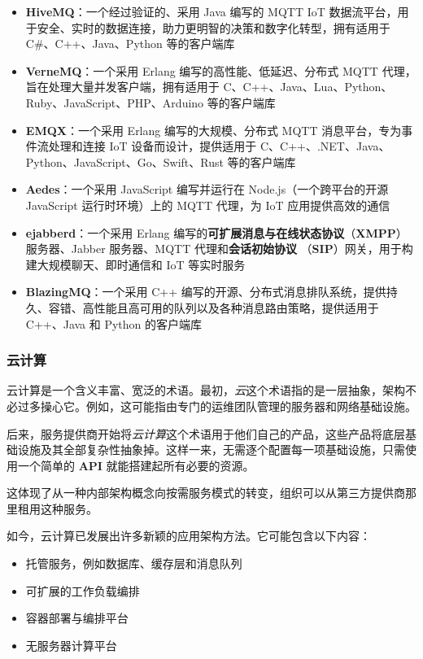 \begin{itemize}
\label{idx:1365}
\item \textbf{HiveMQ}：一个经过验证的、采用 Java 编写的 MQTT IoT 数据流平台，用于安全、实时的数据连接，助力更明智的决策和数字化转型，拥有适用于 C\#、C++、Java、Python 等的客户端库
\label{idx:1366}
\item \textbf{VerneMQ}：一个采用 Erlang 编写的高性能、低延迟、分布式 MQTT 代理，旨在处理大量并发客户端，拥有适用于 C、C++、Java、Lua、Python、Ruby、JavaScript、PHP、Arduino 等的客户端库
\label{idx:1367}
\item \textbf{EMQX}：一个采用 Erlang 编写的大规模、分布式 MQTT 消息平台，专为事件流处理和连接 IoT 设备而设计，提供适用于 C、C++、.NET、Java、Python、JavaScript、Go、Swift、Rust 等的客户端库
\label{idx:1368}
\item \textbf{Aedes}：一个采用 JavaScript 编写并运行在 Node.js（一个跨平台的开源 JavaScript 运行时环境）上的 MQTT 代理，为 IoT 应用提供高效的通信
\label{idx:1369}
\label{idx:1370}
\label{idx:1371}
\item \textbf{ejabberd}：一个采用 Erlang 编写的\textbf{可扩展消息与在线状态协议}（\textbf{XMPP}）服务器、Jabber 服务器、MQTT 代理和\textbf{会话初始协议 }（\textbf{SIP}）网关，用于构建大规模聊天、即时通信和 IoT 等实时服务
\label{idx:1372}
\item \textbf{BlazingMQ}：一个采用 C++ 编写的开源、分布式消息排队系统，提供持久、容错、高性能且高可用的队列以及各种消息路由策略，提供适用于 C++、Java 和 Python 的客户端库
\end{itemize}

\subsubsection{云计算}

\label{idx:1373}
\label{idx:1374}
云计算是一个含义丰富、宽泛的术语。最初，\emph{云}这个术语指的是一层抽象，架构不必过多操心它。例如，这可能指由专门的运维团队管理的服务器和网络基础设施。

后来，服务提供商开始将\emph{云计算}这个术语用于他们自己的产品，这些产品将底层基础设施及其全部复杂性抽象掉。这样一来，无需逐个配置每一项基础设施，只需使用一个简单的 \textbf{API} 就能搭建起所有必要的资源。

这体现了从一种内部架构概念向按需服务模式的转变，组织可以从第三方提供商那里租用这种服务。

如今，云计算已发展出许多新颖的应用架构方法。它可能包含以下内容：

\begin{itemize}
\item 托管服务，例如数据库、缓存层和消息队列
\item 可扩展的工作负载编排
\item 容器部署与编排平台
\item 无服务器计算平台
\end{itemize}

